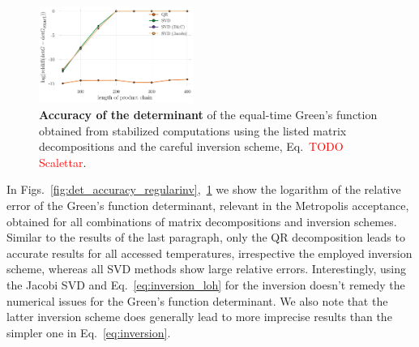 \documentclass[%
 reprint,
superscriptaddress,
showpacs,
 amsmath,amssymb,
 aps,
 prb,
longbibliography,
]{revtex4-1}
\begin{document}
\begin{figure}[b]
	\includegraphics[width=0.45\textwidth]{../notebooks/accuracy_det_svd_loh.pdf}
	\caption{\textbf{Accuracy of the determinant} of the equal-time Green's function obtained from stabilized computations using the listed matrix decompositions and the careful inversion scheme, Eq.~\textcolor{red}{TODO Scalettar}. \label{fig:det_accuracy_loh}}
\end{figure}

In Figs.~\ref{fig:det_accuracy_regularinv},~\ref{fig:det_accuracy_loh} we show the logarithm of the relative error of the Green's function determinant, relevant in the Metropolis acceptance, obtained for all combinations of matrix decompositions and inversion schemes. Similar to the results of the last paragraph, only the QR decomposition leads to accurate results for all accessed temperatures, irrespective the employed inversion scheme, whereas all SVD methods show large relative errors. Interestingly, using the Jacobi SVD and Eq.~\ref{eq:inversion_loh} for the inversion doesn't remedy the numerical issues for the Green's function determinant. We also note that the latter inversion scheme does generally lead to more imprecise results than the simpler one in Eq.~\ref{eq:inversion}.


%
%
%
%		
%
%
%
\end{document}
